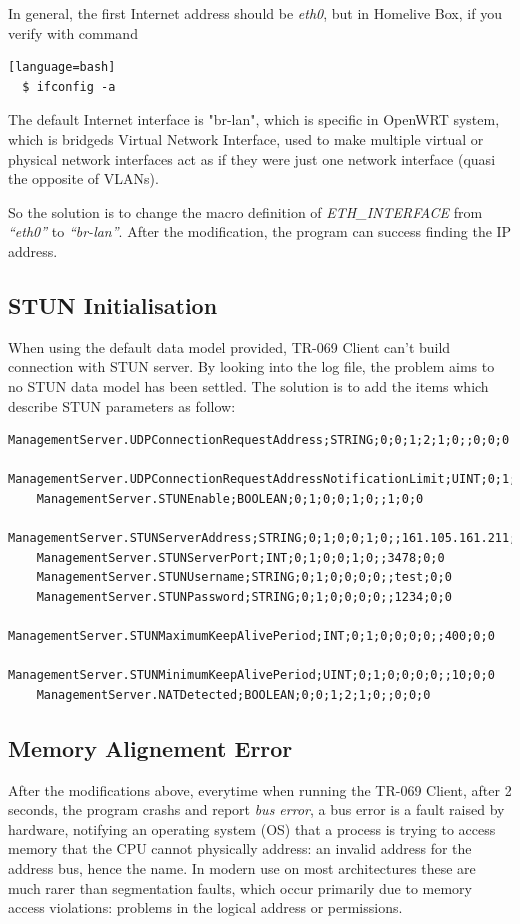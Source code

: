 In general, the first Internet address should be \textit{eth0}, but in Homelive Box, if you verify with command
\begin{lstlisting}[style=DOS][language=bash]
  $ ifconfig -a
\end{lstlisting}

The default Internet interface is "br-lan", which is specific in OpenWRT system, which is bridgeds Virtual Network Interface, used to make multiple virtual or physical network interfaces act as if they were just one network interface (quasi the opposite of VLANs).

So the solution is to change the macro definition of \textit{ETH\_INTERFACE} from \textit{``eth0''} to \textit{``br-lan''}. After the modification, the program can success finding the IP address.
\subsection{STUN Initialisation}

When using the default data model provided, TR-069 Client can't build connection with STUN server. By looking into the log file, the problem aims to no STUN data model has been settled. The solution is to add the items which describe STUN parameters as follow:
\begin{lstlisting}[mathescape]
    ManagementServer.UDPConnectionRequestAddress;STRING;0;0;1;2;1;0;;0;0;0
    ManagementServer.UDPConnectionRequestAddressNotificationLimit;UINT;0;1;0;0;0;0;;0;0;0
    ManagementServer.STUNEnable;BOOLEAN;0;1;0;0;1;0;;1;0;0
    ManagementServer.STUNServerAddress;STRING;0;1;0;0;1;0;;161.105.161.211;0;0
    ManagementServer.STUNServerPort;INT;0;1;0;0;1;0;;3478;0;0
    ManagementServer.STUNUsername;STRING;0;1;0;0;0;0;;test;0;0
    ManagementServer.STUNPassword;STRING;0;1;0;0;0;0;;1234;0;0
    ManagementServer.STUNMaximumKeepAlivePeriod;INT;0;1;0;0;0;0;;400;0;0
    ManagementServer.STUNMinimumKeepAlivePeriod;UINT;0;1;0;0;0;0;;10;0;0
    ManagementServer.NATDetected;BOOLEAN;0;0;1;2;1;0;;0;0;0
\end{lstlisting}
\subsection{Memory Alignement Error}
After the modifications above, everytime when running the TR-069 Client, after 2 seconds, the program crashs and report \textit{bus error}, a bus error is a fault raised by hardware, notifying an operating system (OS) that a process is trying to access memory that the CPU cannot physically address: an invalid address for the address bus, hence the name. In modern use on most architectures these are much rarer than segmentation faults, which occur primarily due to memory access violations: problems in the logical address or permissions.

